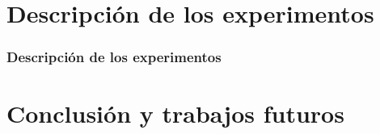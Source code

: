 \documentclass{beamer}
\begin{document}
\section{Descripción de los experimentos}

\begin{frame}

\frametitle{Descripción de los experimentos}












  

\end{frame}

\section{Conclusión y trabajos futuros}
\end{document}
